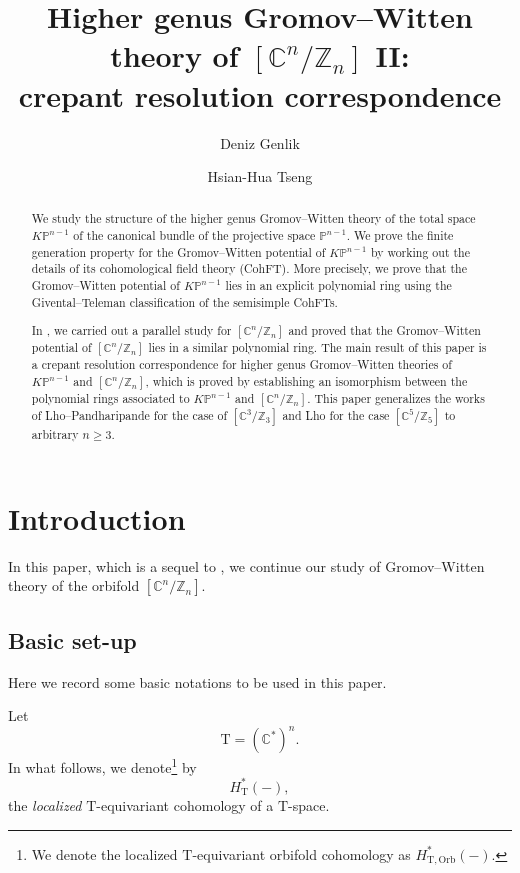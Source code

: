\documentclass[12pt]{amsart}
\title{Higher genus Gromov--Witten theory of $[\mathbb{C}^n/\mathbb{Z}_n]$ II:\\ { }crepant resolution correspondence \hfill}
\author[Genlik]{Deniz Genlik}
\author[Tseng]{Hsian-Hua Tseng}
\numberwithin{equation}{section}
\newcommand{\CnZn}{[\mathbb{C}^n/\mathbb{Z}_n]}
\newcommand{\KP}{K\mathbb{P}}
\begin{document}


\maketitle

\begin{abstract}
We study the structure of the higher genus Gromov--Witten theory of the total space $\KP^{n-1}$ of the canonical bundle of the projective space $\mathbb{P}^{n-1}$. We prove the finite generation property for the Gromov--Witten potential of $\KP^{n-1}$ by working out the details of its cohomological field theory (CohFT). More precisely, we prove that the Gromov--Witten potential of $\KP^{n-1}$ lies in an explicit polynomial ring using the Givental--Teleman classification of the semisimple CohFTs. 

In \cite{gt}, we carried out a parallel study for $\CnZn$ and proved that the Gromov--Witten potential of $\CnZn$ lies in a similar polynomial ring. The main result of this paper is a crepant resolution correspondence for higher genus Gromov--Witten theories of $\KP^{n-1}$ and $\CnZn$, which is proved by establishing an isomorphism between the polynomial rings associated to $\KP^{n-1}$ and $\CnZn$. This paper generalizes the works of Lho--Pandharipande \cite{lho-p2} for the case of $[\mathbb{C}^3/\mathbb{Z}_3]$ and Lho \cite{lho} for the case $[\mathbb{C}^5/\mathbb{Z}_5]$ to arbitrary $n\geq 3$.
\end{abstract}


\tableofcontents

\section{Introduction}

In this paper, which is a sequel to \cite{gt}, we continue our study of Gromov--Witten theory of the orbifold $\CnZn$.
\subsection{Basic set-up}
Here we record some basic notations to be used in this paper.

Let $$\mathrm{T}=(\mathbb{C}^*)^n.$$
In what follows, we denote\footnote{We denote the localized $\mathrm{T}$-equivariant orbifold cohomology as $H_{\mathrm{T,Orb}}^*(-)$.} by 
$$H_\mathrm{T}^*(-),$$ the {\em localized} $\mathrm{T}$-equivariant cohomology of a $\mathrm{T}$-space.
\end{document}
